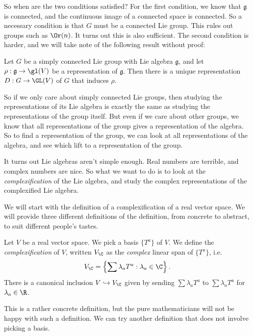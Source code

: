 \documentclass[a4paper]{article}
\begin{document}
So when are the two conditions satisfied? For the first condition, we know that $\mathfrak{g}$ is connected, and the continuous image of a connected space is connected. So a necessary condition is that $G$ must be a connected Lie group. This rules out groups such as $\Or(n)$. It turns out this is also sufficient. The second condition is harder, and we will take note of the following result without proof:
\begin{thm}
  Let $G$ be a simply connected Lie group with Lie algebra $\mathfrak{g}$, and let $\rho: \mathfrak{g} \to \gl(V)$ be a representation of $\mathfrak{g}$. Then there is a unique representation $D: G \to \GL(V)$ of $G$ that induces $\rho$.
\end{thm}
So if we only care about simply connected Lie groups, then studying the representations of its Lie algebra is exactly the same as studying the representations of the group itself. But even if we care about other groups, we know that all representations of the group gives a representation of the algebra. So to find a representation of the group, we can look at all representations of the algebra, and see which lift to a representation of the group.

It turns out Lie algebras aren't simple enough. Real numbers are terrible, and complex numbers are nice. So what we want to do is to look at the \emph{complexification} of the Lie algebra, and study the complex representations of the complexified Lie algebra.

We will start with the definition of a complexification of a real vector space. We will provide three different definitions of the definition, from concrete to abstract, to suit different people's tastes.

\begin{defi}[Complexification I]
  Let $V$ be a real vector space. We pick a basis $\{T^a\}$ of $V$. We define the \emph{complexification} of $V$, written $V_\C$ as the \emph{complex} linear span of $\{T^a\}$, i.e.
  \[
    V_\C = \left\{\sum \lambda_a T^a: \lambda_a \in \C\right\}.
  \]
  There is a canonical inclusion $V \hookrightarrow V_\C$ given by sending $\sum \lambda_a T^a$ to $\sum \lambda_a T^a$ for $\lambda_a \in \R$.
\end{defi}

This is a rather concrete definition, but the pure mathematicians will not be happy with such a definition. We can try another definition that does not involve picking a basis.
\end{document}
